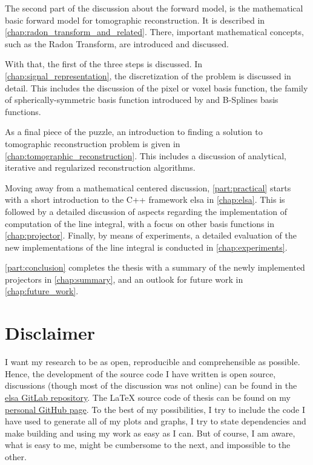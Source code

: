The second part of the discussion about the forward model, is the mathematical basic forward model
for tomographic reconstruction. It is described in \autoref{chap:radon_transform_and_related}. There,
important mathematical concepts, such as the Radon Transform, are introduced and discussed.

With that, the first of the three steps is discussed. In \autoref{chap:signal_representation}, the
discretization of the problem is discussed in detail. This includes the discussion of the pixel or
voxel basis function, the family of spherically-symmetric basis function introduced by
\citeauthor*{lewitt_multidimensional_1990} and B-Splines basis functions.

As a final piece of the puzzle, an introduction to finding a solution to tomographic reconstruction
problem is given in \autoref{chap:tomographic_reconstruction}. This includes a discussion of
analytical, iterative and regularized reconstruction algorithms.

Moving away from a mathematical centered discussion, \autoref{part:practical} starts with a short
introduction to the C++ framework elsa in \autoref{chap:elsa}. This is followed by a detailed
discussion of aspects regarding the implementation of computation of the line integral, with a focus
on other basis functions in \autoref{chap:projector}. Finally, by means of experiments, a detailed
evaluation of the new implementations of the line integral is conducted in
\autoref{chap:experiments}.

\autoref{part:conclusion} completes the thesis with a summary of the newly implemented projectors in
\autoref{chap:summary}, and an outlook for future work in \autoref{chap:future_work}.

\section{Disclaimer}\label{sec:disclaimer}

I want my research to be as open, reproducible and comprehensible as possible. Hence, the
development of the source code I have written is open source, discussions (though most of the
discussion was not online) can be found in the \href{https://gitlab.lrz.de/IP/elsa}{elsa GitLab
	repository}. The \LaTeX{} source code of thesis can be found on my
\href{https://github.com/ner0-m/ma-thesis-differential-basis-for-ct}{personal GitHub page}. To the
best of my possibilities, I try to include the code I have used to generate all of my plots and
graphs, I try to state dependencies and make building and using my work as easy as I can. But of
course, I am aware, what is easy to me, might be cumbersome to the next, and impossible to the
other.

